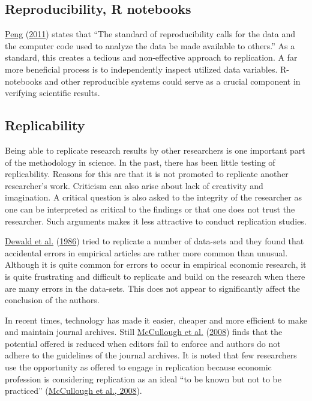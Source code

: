\documentclass[
  11pt,
]{article}
\begin{document}
\hypertarget{reproducibility-r-notebooks}{%
\subsection{Reproducibility, R
notebooks}\label{reproducibility-r-notebooks}}

\protect\hyperlink{ref-peng2011}{Peng}
(\protect\hyperlink{ref-peng2011}{2011}) states that ``The standard of
reproducibility calls for the data and the computer code used to analyze
the data be made available to others.'' As a standard, this creates a
tedious and non-effective approach to replication. A far more beneficial
process is to independently inspect utilized data variables. R-notebooks
and other reproducible systems could serve as a crucial component in
verifying scientific results.

\hypertarget{replicability}{%
\subsection{Replicability}\label{replicability}}

Being able to replicate research results by other researchers is one
important part of the methodology in science. In the past, there has
been little testing of replicability. Reasons for this are that it is
not promoted to replicate another researcher's work. Criticism can also
arise about lack of creativity and imagination. A critical question is
also asked to the integrity of the researcher as one can be interpreted
as critical to the findings or that one does not trust the researcher.
Such arguments makes it less attractive to conduct replication studies.

\protect\hyperlink{ref-dewald1986}{Dewald et al.}
(\protect\hyperlink{ref-dewald1986}{1986}) tried to replicate a number
of data-sets and they found that accidental errors in empirical articles
are rather more common than unusual. Although it is quite common for
errors to occur in empirical economic research, it is quite frustrating
and difficult to replicate and build on the research when there are many
errors in the data-sets. This does not appear to significantly affect
the conclusion of the authors.

In recent times, technology has made it easier, cheaper and more
efficient to make and maintain journal archives. Still
\protect\hyperlink{ref-mccullough2008}{McCullough et al.}
(\protect\hyperlink{ref-mccullough2008}{2008}) finds that the potential
offered is reduced when editors fail to enforce and authors do not
adhere to the guidelines of the journal archives. It is noted that few
researchers use the opportunity as offered to engage in replication
because economic profession is considering replication as an ideal ``to
be known but not to be practiced''
(\protect\hyperlink{ref-mccullough2008}{McCullough et al., 2008}).
\end{document}
